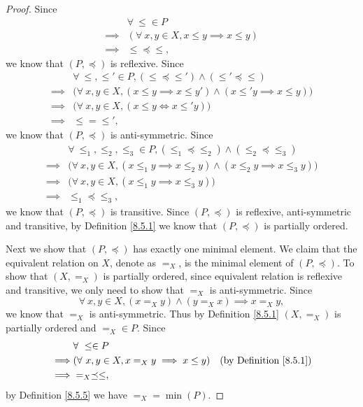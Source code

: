 \begin{proof}
    Since
    \begin{align*}
                 & \forall\ \leq \in P                               \\
        \implies & (\forall\ x, y \in X, x \leq y \implies x \leq y) \\
        \implies & \leq \preceq \leq,
    \end{align*}
    we know that \((P, \preceq)\) is reflexive.
    Since
    \begin{align*}
                 & \forall\ \leq, \leq' \in P, (\leq \preceq \leq') \land (\leq' \preceq \leq)                      \\
        \implies & \big(\forall\ x, y \in X, (x \leq y \implies x \leq y') \land (x \leq' y \implies x \leq y)\big) \\
        \implies & \big(\forall\ x, y \in X, (x \leq y \iff x \leq' y)\big)                                         \\
        \implies & \leq = \leq',
    \end{align*}
    we know that \((P, \preceq)\) is anti-symmetric.
    Since
    \begin{align*}
                 & \forall\ \leq_1, \leq_2, \leq_3 \in P, (\leq_1 \preceq \leq_2) \land (\leq_2 \preceq \leq_3)           \\
        \implies & \big(\forall\ x, y \in X, (x \leq_1 y \implies x \leq_2 y) \land (x \leq_2 y \implies x \leq_3 y)\big) \\
        \implies & \big(\forall\ x, y \in X, (x \leq_1 y \implies x \leq_3 y)\big)                                        \\
        \implies & \leq_1 \preceq \leq_3,
    \end{align*}
    we know that \((P, \preceq)\) is transitive.
    Since \((P, \preceq)\) is reflexive, anti-symmetric and transitive, by Definition \ref{8.5.1} we know that \((P, \preceq)\) is partially ordered.

    Next we show that \((P, \preceq)\) has exactly one minimal element.
    We claim that the equivalent relation on \(X\), denote as \(=_X\), is the minimal element of \((P, \preceq)\).
    To show that \((X, =_X)\) is partially ordered, since equivalent relation is reflexive and transitive, we only need to show that \(=_X\) is anti-symmetric.
    Since
    \[
        \forall\ x, y \in X, (x =_X y) \land (y =_X x) \implies x =_X y,
    \]
    we know that \(=_X\) is anti-symmetric.
    Thus by Definition \ref{8.5.1} \((X, =_X)\) is partially ordered and \(=_X \in P\).
    Since
    \begin{align*}
                 & \forall\ \leq \in P                                                                   \\
        \implies & (\forall\ x, y \in X, x =_X y \implies x \leq y) & \text{(by Definition \ref{8.5.1})} \\
        \implies & =_X \preceq \leq,
    \end{align*}
    by Definition \ref{8.5.5} we have \(=_X = \min(P)\).


\end{proof}
